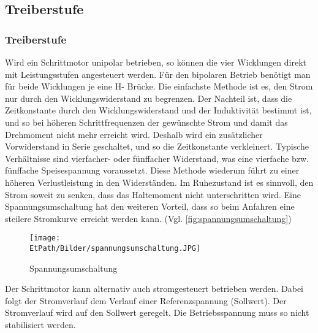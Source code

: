     \ifSTANDALONE
    \subsection{Treiberstufe}
    \fi
    \ifEMBED
    \subsubsection{Treiberstufe}
    \fi 
    	Wird ein Schrittmotor unipolar betrieben, so können die vier Wicklungen direkt mit Leistungsstufen angesteuert werden. Für den bipolaren Betrieb benötigt man für beide Wicklungen je eine H- Brücke. Die einfachste Methode ist es, den Strom nur durch den Wicklungswiderstand zu begrenzen. Der Nachteil ist, dass die Zeitkonstante durch den Wicklungswiderstand und der Induktivität bestimmt ist, und so bei höheren Schrittfrequenzen der gewünschte Strom und damit das Drehmoment nicht mehr erreicht wird. Deshalb wird ein zusätzlicher Vorwiderstand in Serie geschaltet, und so die Zeitkonstante verkleinert. Typische Verhältnisse sind vierfacher- oder fünffacher Widerstand, was eine vierfache bzw. fünffache Speisespannung voraussetzt. Diese Methode wiederum führt zu einer höheren Verlustleistung in den Widerständen. Im Ruhezustand ist es sinnvoll, den Strom soweit zu senken, dass das Haltemoment nicht unterschritten wird. Eine Spannungsumschaltung hat den weiteren Vorteil, dass so beim Anfahren eine steilere Stromkurve erreicht werden kann. (Vgl. \autoref{fig:spannungsumschaltung})
    	 \begin{figure}
    	 	\centering
    	 	\texttt{[image: \\EtPath/Bilder/spannungsumschaltung.JPG]}
    	 	\caption{Spannungsumschaltung}
    	 	\label{fig:spannungsumschaltung}
    	 \end{figure}
    	Der Schrittmotor kann alternativ auch stromgesteuert betrieben werden. Dabei folgt der Stromverlauf dem Verlauf einer Referenzspannung (Sollwert). Der Stromverlauf wird auf den Sollwert geregelt. Die Betriebsspannung muss so nicht stabilisiert werden. \label{stromgesteuert} 
	
	
		